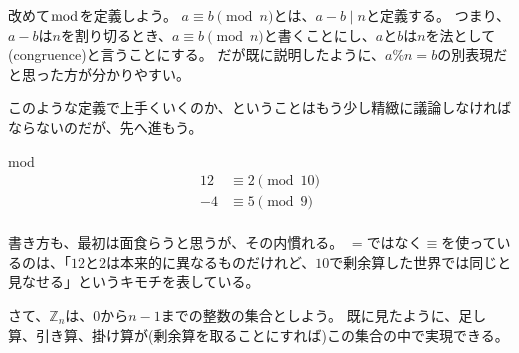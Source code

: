 改めて$\bmod$を定義しよう。
$a \equiv b \pmod{n}$とは、$a-b \mid n$と定義する。
つまり、$a-b$は$n$を割り切るとき、$a \equiv b \pmod{n}$と書くことにし、$a$と$b$は$n$を法として(congruence)と言うことにする。
だが既に説明したように、$a \% n = b$の別表現だと思った方が分かりやすい。

このような定義で上手くいくのか、ということはもう少し精緻に議論しなければならないのだが、先へ進もう。

\begin{Exam}{}{mod}
\begin{align*}
12 &\equiv 2 \pmod{10}\\
-4 &\equiv 5 \pmod{9}\\
\end{align*}
\end{Exam}

書き方も、最初は面食らうと思うが、その内慣れる。
$=$ではなく$\equiv$を使っているのは、「$12$と$2$は本来的に異なるものだけれど、$10$で剰余算した世界では同じと見なせる」というキモチを表している。

さて、$\mathbb{Z}_n$は、$0$から$n-1$までの整数の集合としよう。
既に見たように、足し算、引き算、掛け算が(剰余算を取ることにすれば)この集合の中で実現できる。

